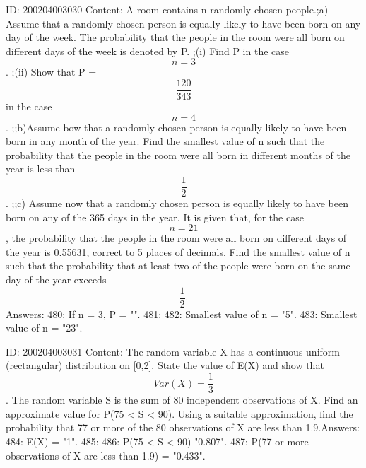 \documentclass{article}
\begin{document}
ID: 200204003030
Content:
A room contains n randomly chosen people.;a) Assume that a randomly chosen person is equally likely to have been born on any day of the week. The probability that the people in the room were all born on different days of the week is denoted by P.   ;(i) Find P in the case $$n = 3$$.  ;(ii) Show that P = $$\frac{120}{343}$$ in the case $$n = 4$$.  ;;b)Assume bow that a randomly chosen person is equally likely to have been born in any month of the year. Find the smallest value of n such that the probability that the people in the room were all born in different months of the year is less than $$\frac{1}{2}$$. ;;c) Assume now that a randomly chosen person is equally likely to have been born on any of the 365 days in the year. It is given that, for the case $$n = 21$$, the probability that the people in the room were all born on different days of the year is 0.55631, correct to 5 places of decimals. Find the smallest value of n such that the probability that at least two of the people were born on the same day of the year exceeds $$\frac{1}{2}.$$  Answers:
480: If n = 3, P = "".
481: 
482: Smallest value of n = "5".
483: Smallest value of n = "23".

ID: 200204003031
Content:
The random variable X has a continuous uniform (rectangular) distribution on [0,2]. State the value of E(X) and show that $$Var(X) = \frac{1}{3}$$. The random variable S is the sum of 80 independent observations of X. Find an approximate value for P(75 < S < 90). Using a suitable approximation, find the probability that 77 or more of the 80 observations of X are less than 1.9.Answers:
484: E(X) = "1".
485: 
486: P(75 < S < 90) \approx "0.807".
487: P(77 or more observations of X are less than 1.9) = "0.433".
\end{document}
